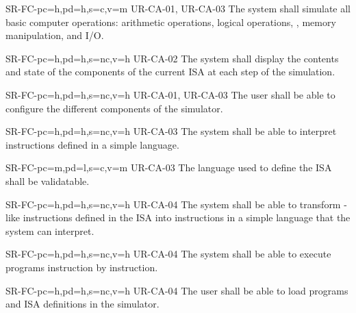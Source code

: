 \begin{softwareReq}{SR-FC-}{pc=h,pd=h,s=c,v=m}
  {UR-CA-01, UR-CA-03}
  The system shall simulate all basic computer operations: \glspl{arithmetic operation}, \glspl{logical operation}, , \gls{memory} manipulation, and \gls{I/O}.
\end{softwareReq}

\begin{softwareReq}{SR-FC-}{pc=h,pd=h,s=nc,v=h}
  {UR-CA-02}
  The system shall display the contents and state of the components of the current \gls{ISA} at each step of the simulation.
\end{softwareReq}

\begin{softwareReq}{SR-FC-}{pc=h,pd=h,s=nc,v=h}
  {UR-CA-01, UR-CA-03}
  The user shall be able to configure the different components of the simulator.
\end{softwareReq}

\begin{softwareReq}{SR-FC-}{pc=h,pd=h,s=nc,v=h}
  {UR-CA-03}
  The system shall be able to interpret instructions defined in a simple language.
\end{softwareReq}

\begin{softwareReq}{SR-FC-}{pc=m,pd=l,s=c,v=m}
  {UR-CA-03}
  The language used to define the \gls{ISA} shall be validatable.
\end{softwareReq}

\begin{softwareReq}{SR-FC-}{pc=h,pd=h,s=nc,v=h}
  {UR-CA-04}
  The system shall be able to transform -like instructions  defined in the \gls{ISA} into instructions in a simple language that the system can interpret.
\end{softwareReq}

\begin{softwareReq}{SR-FC-}{pc=h,pd=h,s=nc,v=h}
  {UR-CA-04}
  The system shall be able to execute programs instruction by instruction.
\end{softwareReq}

\begin{softwareReq}{SR-FC-}{pc=h,pd=h,s=nc,v=h}
  {UR-CA-04}
  The user shall be able to load programs and \gls{ISA} definitions in the simulator.
\end{softwareReq}

